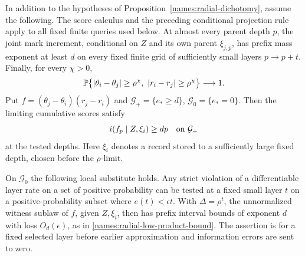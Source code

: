 \begin{proposition}\label{names:radial-pin-product}
In addition to the hypotheses of
Proposition~\ref{names:radial-dichotomy}, assume the following.
The score calculus and the preceding conditional projection
rule apply to all fixed finite queries used below.  At almost
every parent depth $p$, the joint mark increment, conditional
on $Z$ and its own parent $\xi_{j,p}$, has prefix mass exponent
at least $d$ on every fixed finite grid of sufficiently small
layers $p\to p+t$.  Finally, for every $\chi>0$,
\[
 \mathbb P\bigl\{|\theta_i-\theta_j|\geq\rho^\chi,
                 \ |r_i-r_j|\geq\rho^\chi\bigr\}
             \longrightarrow1.
\]
Put $f=(\theta_j-\theta_i)(r_j-r_i)$ and
$\mathcal G_+=\{e_*\geq d\}$, $\mathcal G_0=\{e_*=0\}$.
Then the limiting cumulative scores satisfy
\begin{equation}\label{names:radial-high-product}
 i(f_p\mid Z,\xi_i)\geq dp
       \quad\hbox{on }\mathcal G_+
\end{equation}
at the tested depths.  Here $\xi_i$ denotes a record stored to
a sufficiently large fixed depth, chosen before the $\rho$-limit.

On $\mathcal G_0$ the following local substitute holds.  Any
strict violation of a differentiable layer rate on a set of
positive probability can be tested at a fixed small layer $t$
on a positive-probability subset where
$e(t)<\epsilon t$.  With $\Delta=\rho^t$, the unnormalized
witness sublaw of $f$, given $Z,\xi_i$, then has prefix
interval bounds of exponent $d$ with loss $O_d(\epsilon)$,
as in \eqref{names:radial-low-product-bound}.  The assertion is
for a fixed selected layer before earlier approximation and
information errors are sent to zero.
\end{proposition}

